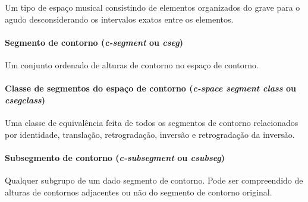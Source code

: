 \documentclass[12pt,brazil]{book}
\newcommand{\eng}[1]{\textit{#1}}
\begin{document}
Um tipo de espaço musical consistindo de elementos organizados do
grave para o agudo desconsiderando os intervalos exatos entre os
elementos.

\paragraph{Segmento de contorno (\eng{c-segment} ou \eng{cseg})}
\label{sec:segmento-de-contorno}

Um conjunto ordenado de alturas de contorno no espaço de contorno.

\paragraph{Classe de segmentos do espaço de contorno (\eng{c-space segment class} ou \eng{csegclass})}
\label{sec:classe-de-segmentos}

Uma classe de equivalência feita de todos os segmentos de contorno
relacionados por identidade, translação, retrogradação, inversão e
retrogradação da inversão.

\paragraph{Subsegmento de contorno (\eng{c-subsegment} ou \eng{csubseg})}
\label{sec:subs-de-cont}

Qualquer subgrupo de um dado segmento de contorno. Pode ser
compreendido de alturas de contornos adjacentes ou não do segmento de
contorno original.
\end{document}
